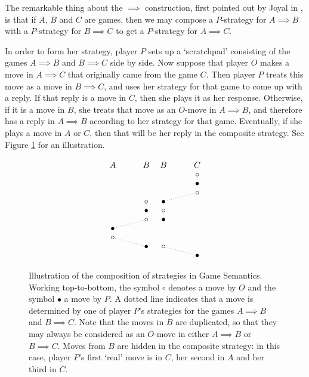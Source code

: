 The remarkable thing about the $\implies$ construction, first pointed out by Joyal in \cite{joyalgames}, is that if $A$, $B$ and $C$ are games, then we may compose a $P$-strategy for $A\implies B$ with a $P$-strategy for $B\implies C$ to get a $P$-strategy for $A\implies C$.

In order to form her strategy, player $P$ sets up a `scratchpad' consisting of the games $A\implies B$ and $B\implies C$ side by side.
Now suppose that player $O$ makes a move in $A\implies C$ that originally came from the game $C$.  
Then player $P$ treats this move as a move in $B\implies C$, and uses her strategy for that game to come up with a reply.  
If that reply is a move in $C$, then she plays it as her response.
Otherwise, if it is a move in $B$, she treats that move as an $O$-move in $A\implies B$, and therefore has a reply in $A\implies B$ according to her strategy for that game.  
Eventually, if she plays a move in $A$ or $C$, then that will be her reply in the composite strategy.
See Figure \ref{FigComposition} for an illustration.
\begin{figure}
  \[
    \begin{tikzcd}[arrows={no head, dotted, shorten=-1.5mm}, row sep=-1pt]
      A
        & B
          &[-20pt] B
            & C \\
        & 
          &
            & \circ \arrow[d] \\
        & 
          & 
            & \bullet \\
        & 
          & 
            & \circ \arrow[dl] \\
        & \circ \arrow[d]
          & \bullet
            & \\
        & \bullet
          & \circ \arrow[d]
            & \\
        & \circ \arrow[dl]
          & \bullet
            & \\
      \bullet
        &
          &
            & \\
      \circ \arrow[dr]
        &
          &
            & \\
        & \bullet
          & \circ \arrow[dr]
            & \\
        &
          &
            & \bullet
    \end{tikzcd}
    \]
  \caption[Illustration of the composition of strategies in Game Semantics.]{Illustration of the composition of strategies in Game Semantics.  
  Working top-to-bottom, the symbol $\circ$ denotes a move by $O$ and the symbol $\bullet$ a move by $P$.  
  A dotted line indicates that a move is determined by one of player $P$'s strategies for the games $A\implies B$ and $B\implies C$.  
  Note that the moves in $B$ are duplicated, so that they may always be considered as an $O$-move in either $A\implies B$ or $B\implies C$.  
  Moves from $B$ are hidden in the composite strategy: in this case, player $P$'s first `real' move is in $C$, her second in $A$ and her third in $C$.}
  \label{FigComposition}
\end{figure}

